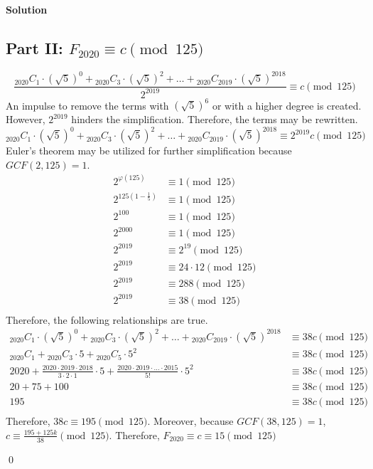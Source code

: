 \documentclass{article}
\newenvironment{solution}{\begin{trivlist}\item[]
{\bf Solution}}{\qed \end{trivlist}}
\begin{document}
\begin{solution}
\subsection*{Part II: $F_{2020} \equiv c \pmod{125}$}
\[
\frac{{}_{2020}C_{1}\cdot(\sqrt{5})^0+{}_{2020}C_{3}\cdot(\sqrt{5})^2+\dots+{}_{2020}C_{2019}\cdot(\sqrt{5})^{2018}}{2^{2019}} \equiv c \pmod{125}
\]
An impulse to remove the terms with $(\sqrt{5})^6$ or with a higher degree is created. However, $2^{2019}$ hinders the simplification. Therefore, the terms may be rewritten.
\[
{}_{2020}C_{1}\cdot(\sqrt{5})^0+{}_{2020}C_{3}\cdot(\sqrt{5})^2+\dots+{}_{2020}C_{2019}\cdot(\sqrt{5})^{2018} \equiv 2^{2019}c \pmod{125}
\]
Euler's theorem may be utilized for further simplification because $GCF(2,125)=1$.
\begin{align*}
2^{\varphi(125)}&\equiv1\pmod{125} \\
2^{125\left(1-\frac{1}{5}\right)}&\equiv1\pmod{125} \\
2^{100}&\equiv1\pmod{125} \\
2^{2000}&\equiv1\pmod{125} \\
2^{2019}&\equiv2^{19}\pmod{125} \\
2^{2019}&\equiv24\cdot12\pmod{125} \\
2^{2019}&\equiv288\pmod{125} \\
2^{2019}&\equiv38\pmod{125} \\
\end{align*}
Therefore, the following relationships are true.
\begin{align*}
{}_{2020}C_{1}\cdot(\sqrt{5})^0+{}_{2020}C_{3}\cdot(\sqrt{5})^2+\dots+{}_{2020}C_{2019}\cdot(\sqrt{5})^{2018} &\equiv 38c \pmod{125} \\
{}_{2020}C_{1}+{}_{2020}C_{3}\cdot5+{}_{2020}C_{5}\cdot5^2 &\equiv 38c \pmod{125} \\
2020+\frac{2020\cdot2019\cdot2018}{3\cdot2\cdot1}\cdot5+\frac{2020\cdot2019\cdot\dots\cdot2015}{5!}\cdot5^2 &\equiv 38c \pmod{125} \\
20+75+100 &\equiv 38c \pmod{125} \\
195 &\equiv 38c \pmod{125} \\
\end{align*}
Therefore, $38c\equiv195\pmod{125}$. Moreover, because $GCF(38,125)=1$, $c\equiv\frac{195+125k}{38}\pmod{125}$. Therefore, $F_{2020}\equiv c\equiv15\pmod{125}$

\end{solution}
\end{document}
